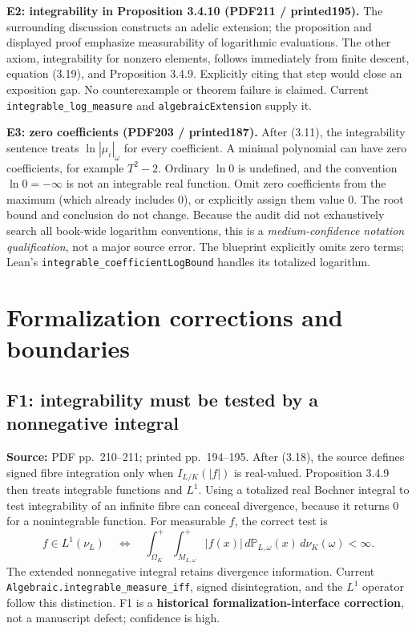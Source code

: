 \documentclass[11pt,a4paper]{article}
\newcommand{\PP}{\mathbb P}
\newcommand{\code}[1]{{\small\nolinkurl{#1}}}
\newcommand{\loc}[2]{\par\noindent\textbf{Source:} PDF pp.~#1; printed pp.~#2.}
\begin{document}
\textbf{E2: integrability in Proposition 3.4.10 (PDF211 / printed195).}
The surrounding discussion constructs an adelic extension; the proposition and displayed proof emphasize measurability of logarithmic evaluations. The other axiom, integrability for nonzero elements, follows immediately from finite descent, equation (3.19), and Proposition 3.4.9. Explicitly citing that step would close an exposition gap. No counterexample or theorem failure is claimed. Current \code{integrable_log_measure} and \code{algebraicExtension} supply it.

\textbf{E3: zero coefficients (PDF203 / printed187).}
After (3.11), the integrability sentence treats $\ln|\mu_i|_\omega$ for every coefficient. A minimal polynomial can have zero coefficients, for example $T^2-2$. Ordinary $\ln0$ is undefined, and the convention $\ln0=-\infty$ is not an integrable real function. Omit zero coefficients from the maximum (which already includes 0), or explicitly assign them value 0. The root bound and conclusion do not change. Because the audit did not exhaustively search all book-wide logarithm conventions, this is a \emph{medium-confidence notation qualification}, not a major source error. The blueprint explicitly omits zero terms; Lean's \code{integrable_coefficientLogBound} handles its totalized logarithm.


\clearpage
\section{Formalization corrections and boundaries}\label{formal}
\subsection{F1: integrability must be tested by a nonnegative integral}
\loc{210--211}{194--195}
After (3.18), the source defines signed fibre integration only when $I_{L/K}(|f|)$ is real-valued. Proposition 3.4.9 then treats integrable functions and $L^1$. Using a totalized real Bochner integral to test integrability of an infinite fibre can conceal divergence, because it returns 0 for a nonintegrable function. For measurable $f$, the correct test is
\[
 f\in L^1(\nu_L)\quad\Longleftrightarrow\quad
 \int_{\Omega_K}^{+}\!\int_{M_{L,\omega}}^{+}|f(x)|\,d\PP_{L,\omega}(x)\,d\nu_K(\omega)<\infty.
\]
The extended nonnegative integral retains divergence information. Current
\code{Algebraic.integrable_measure_iff}, signed disintegration, and the $L^1$ operator follow this distinction.
F1 is a \textbf{historical formalization-interface correction}, not a manuscript defect; confidence is high.
\end{document}
